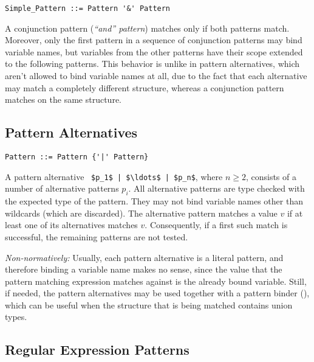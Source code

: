 \syntax\begin{lstlisting}
Simple_Pattern ::= Pattern '&' Pattern
\end{lstlisting}

A conjunction pattern ({\em {\normalfont ``and''} pattern}) matches only if both patterns match. Moreover, only the first pattern in a sequence of conjunction patterns may bind variable names, but variables from the other patterns have their scope extended to the following patterns. This behavior is unlike in pattern alternatives, which aren't allowed to bind variable names at all, due to the fact that each alternative may match a completely different structure, whereas a conjunction pattern matches on the same structure. 





\subsection{Pattern Alternatives}
\label{sec:pattern-alternatives}

\syntax\begin{lstlisting}
Pattern ::= Pattern {'|' Pattern}
\end{lstlisting}

A pattern alternative ~\lstinline!$p_1$ | $\ldots$ | $p_n$!, where $n \geq 2$, consists of a number of alternative patterns $p_i$. All alternative patterns are type checked with the expected type of the pattern. They may not bind variable names other than wildcards (which are discarded). The alternative pattern matches a value $v$ if at least one of its alternatives matches $v$. Consequently, if a first such match is successful, the remaining patterns are not tested.

{\em Non-normatively:} Usually, each pattern alternative is a literal pattern, and therefore binding a variable name makes no sense, since the value that the pattern matching expression matches against is the already bound variable. Still, if needed, the pattern alternatives may be used together with a pattern binder (), which can be useful when the structure that is being matched contains union types. 





\subsection{Regular Expression Patterns}
\label{sec:regexp-patterns}

